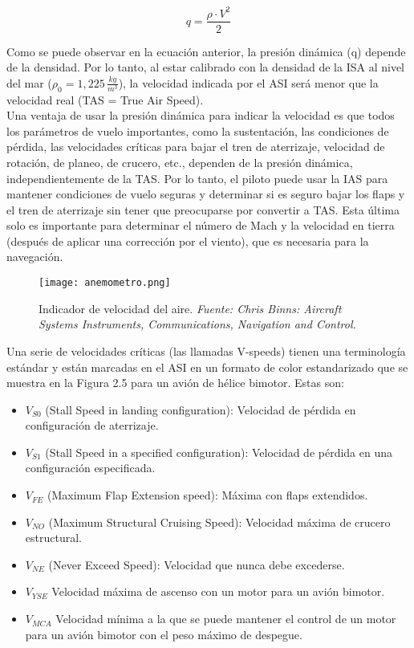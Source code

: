\begin{equation}
q = \frac{\rho \cdot V^{2}}{2}
\end{equation}

Como se puede observar en la ecuación anterior, la presión dinámica (q) depende de la densidad. Por lo tanto, al estar calibrado con la densidad de la ISA al nivel del mar (\(\rho_{0} = 1,225 \, \frac{kg}{m^{3}}\)), la velocidad indicada por el ASI será menor que la velocidad real (TAS = True Air Speed).\\


Una ventaja de usar la presión dinámica para indicar la velocidad es que todos los parámetros de vuelo importantes, como la sustentación, las condiciones de pérdida, las velocidades críticas para bajar el tren de aterrizaje, velocidad de rotación, de planeo, de crucero, etc., dependen de la presión dinámica, independientemente de la TAS. Por lo tanto, el piloto puede usar la IAS para mantener condiciones de vuelo seguras y determinar si es seguro bajar los flaps y el tren de aterrizaje sin tener que preocuparse por convertir a TAS. Esta última solo es importante para determinar el número de Mach y la velocidad en tierra (después de aplicar una corrección por el viento), que es necesaria para la navegación.\\

\begin{figure}[H] 
    \centering
    \texttt{[image: anemometro.png]}
    \caption{\centering Indicador de velocidad del aire. \textit{Fuente: Chris Binns: Aircraft Systems Instruments, Communications, Navigation and Control.}}
    \label{fig:placeholder123}
\end{figure}

 Una serie de velocidades críticas (las llamadas V-speeds) tienen una terminología estándar y están marcadas en el ASI en un formato de color estandarizado que se muestra en la Figura 2.5 para un avión de hélice
 bimotor. Estas son:\\
 
 \begin{itemize}
\item \(V_{S0}\) (Stall Speed in landing configuration): Velocidad de pérdida en configuración de aterrizaje.
\item \(V_{S1}\) (Stall Speed in a specified configuration): Velocidad de pérdida en una configuración especificada.
\item \(V_{FE}\) (Maximum Flap Extension speed): Máxima con flaps extendidos.
\item \(V_{NO}\) (Maximum Structural Cruising Speed): Velocidad máxima de crucero estructural.
\item \(V_{NE}\) (Never Exceed Speed): Velocidad que nunca debe excederse.
\item \(V_{YSE}\) Velocidad máxima de ascenso con un motor para un avión bimotor.
\item \(V_{MCA}\) Velocidad mínima a la que se puede mantener el control de un motor para
un avión bimotor con el peso máximo de despegue.\\
\end{itemize}

